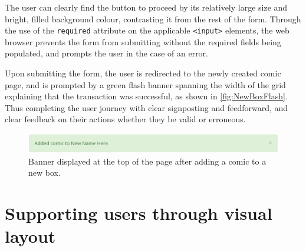 \documentclass[fontsize=12pt,a4paper]{scrreprt}
\begin{document}
The user can clearly find the button to proceed by its relatively large size and bright, filled background colour, contrasting it from the rest of the form. Through the use of the \texttt{required} attribute on the applicable \texttt{<input>} elements, the web browser prevents the form from submitting without the required fields being populated, and prompts the user in the case of an error.

Upon submitting the form, the user is redirected to the newly created comic page, and is prompted by a green flash banner spanning the width of the grid explaining that the transaction was successful, as shown in \autoref{fig:NewBoxFlash}. Thus completing the user journey with clear signposting and feedforward, and clear feedback on their actions whether they be valid or erroneous.

\begin{figure}[b]
  \centering
  \includegraphics[width=\textwidth]{new_box_flash.png}
  \caption{
    Banner displayed at the top of the page after adding a comic to a new box.
  }
  \label{fig:NewBoxFlash}
\end{figure}

\newpage
\section{Supporting users through visual layout}


\lipsum[3-6]
\end{document}
